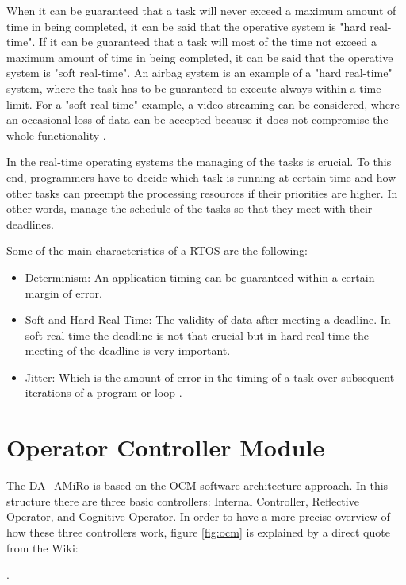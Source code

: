 \documentclass[12pt]{report}%
\begin{document}
When it can be guaranteed that a task will never exceed a maximum amount of time in being completed, it can be said that the operative system is "hard real-time". If it can be guaranteed that a task will most of the time not exceed a maximum amount of time in being completed, it can be said that the operative system is "soft real-time". An airbag system is an example of a "hard real-time" system, where the task has to be guaranteed to execute always within a time limit. For a "soft real-time" example, a video streaming can be considered, where an occasional loss of data can be accepted because it does not compromise the whole functionality \cite{rtos}.

In the real-time operating systems the managing of the tasks is crucial. To this end, programmers have to decide which task is running at certain time and how other tasks can preempt the processing resources if their priorities are higher. In other words, manage the schedule of the tasks so that they meet with their deadlines.

Some of the main characteristics of a RTOS are the following:

\begin{itemize}
\item Determinism: An application timing can be guaranteed within a certain margin of error.
\item Soft and Hard Real-Time: The validity of data after meeting a deadline. In soft real-time the deadline is not that crucial but in hard real-time the meeting of the deadline is very important.
\item Jitter: Which is the amount of error in the timing of a task over subsequent iterations of a program or loop \cite{whatisRTOS}.
\end{itemize}

\section{Operator Controller Module}

The DA\_AMiRo is based on the OCM \cite{ocmAuto} software architecture approach. In this structure there are three basic controllers: Internal Controller, Reflective Operator, and Cognitive Operator. In order to have a more precise overview of how these three controllers work, figure \ref{fig:ocm} is explained by a direct quote from the Wiki:

\cite{DAEbot_Wiki}.
\end{document}
